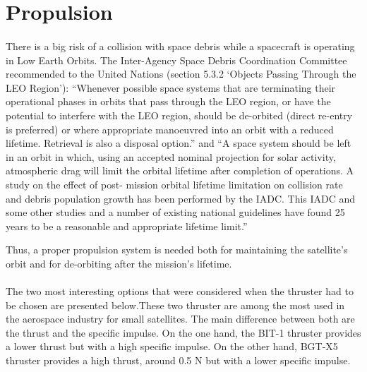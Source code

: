 \section{Propulsion}

\paragraph{}
There is a big risk of a collision with space debris while a spacecraft is operating in Low Earth Orbits. The Inter-Agency Space Debris Coordination Committee recommended to the United Nations (section 5.3.2 ‘Objects Passing Through the LEO Region’): “Whenever possible space systems that are terminating their operational phases in orbits that pass through the LEO region, or have the potential to interfere with the LEO region, should be de-orbited (direct re-entry is preferred) or where appropriate manoeuvred into an orbit with a reduced lifetime. Retrieval is also a disposal option.” and “A space system should be left in an orbit in which, using an accepted nominal projection for solar activity, atmospheric drag will limit the orbital lifetime after completion of operations. A study on the effect of post- mission orbital lifetime limitation on collision rate and debris population growth has been performed by the IADC. This IADC and some other studies and a number of existing national guidelines have found 25 years to be a reasonable and appropriate lifetime limit.” \cite{collisionLEO}

Thus, a proper propulsion system is needed both for maintaining the satellite's orbit and for de-orbiting after the mission's lifetime.
 
\paragraph{}The two most interesting options that were considered when the thruster had to be chosen are presented below.These two thruster are among the most used in the aerospace industry for small satellites. The main difference between both are the thrust and the specific impulse. On the one hand, the BIT-1 thruster provides a lower thrust but with a high specific impulse. On the other hand, BGT-X5 thruster provides a high thrust, around 0.5 N but with a lower specific impulse.

